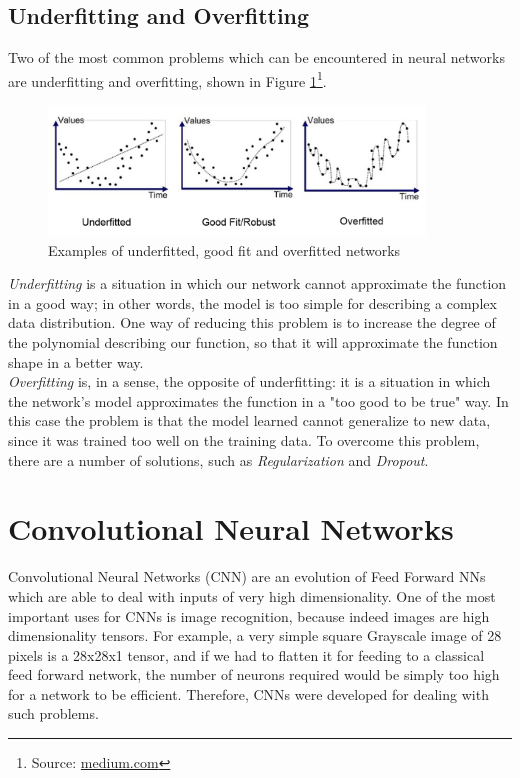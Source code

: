 \subsection{Underfitting and Overfitting}
\label{sec:overfitting}

Two of the most common problems which can be encountered in neural networks are underfitting and overfitting, shown in Figure \ref{fig:fitting}\footnote{Source: \href{https://medium.com/greyatom/what-is-underfitting-and-overfitting-in-machine-learning-and-how-to-deal-with-it-6803a989c76}{medium.com}}.

\begin{figure}[h!]
	\centering
	\includegraphics[width=10cm]{images/UnderOverFitting.png}
	\caption{Examples of underfitted, good fit and overfitted networks}
	\label{fig:fitting}
\end{figure}

\textit{Underfitting} is a situation in which our network cannot approximate the function in a good way; in other words, the model is too simple for describing a complex data distribution. One way of reducing this problem is to increase the degree of the polynomial describing our function, so that it will approximate the function shape in a better way.
\\
\indent \textit{Overfitting} is, in a sense, the opposite of underfitting: it is a situation in which the network's model approximates the function in a "too good to be true" way. In this case the problem is that the model learned cannot generalize to new data, since it was trained too well on the training data. To overcome this problem, there are a number of solutions, such as \textit{Regularization} and \textit{Dropout}.

\section{Convolutional Neural Networks}

Convolutional Neural Networks (CNN) are an evolution of Feed Forward NNs which are able to deal with inputs of very high dimensionality. One of the most important uses for CNNs is image recognition, because indeed images are high dimensionality tensors. For example, a very simple square Grayscale image of 28 pixels is a 28x28x1 tensor, and if we had to flatten it for feeding to a classical feed forward network, the number of neurons required would be simply too high for a network to be efficient. Therefore, CNNs were developed for dealing with such problems.

